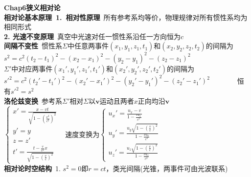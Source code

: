 \documentclass[10pt,a4paper]{article}
\begin{document}
\begin{multicols}{2}
\noindent\textbf{Chap6狭义相对论}\\
\tiny\textbf{相对论基本原理~1.~相对性原理}~所有参考系均等价，物理规律对所有惯性系均为相同形式\\
\indent\textbf{2. 光速不变原理}~真空中光速对任一惯性系沿任一方向恒为$c$\scriptsize\\
\textbf{间隔不变性}~惯性系$\Sigma$中任意两事件$(x_1,y_1,z_1,t_1)$和$(x_2,y_2,z_2,t_2)$的间隔为$s^2=c^2(t_2-t_1)^2-(x_2-x_1)^2-(y_2-y_1)^2-(z_2-z_1)^2$\\
$\Sigma'$中对应两事件$(x_1',y_1',z_1',t_1')$和$(x_2',y_2',z_2',t_2')$的间隔为$s'^2=c^2(t_2'-t_1')^2-(x_2'-x_1')^2-(y_2'-y_1')^2-(z_2'-z_1')^2$~~~~~~~~恒有$s'^2=s^2$\\
\textbf{洛伦兹变换}~参考系$\Sigma'$相对$\Sigma$以$\bm{v}$运动且两者$x$正向均沿$\bm{v}$\\
$\left\{\begin{array}{l}x'=\frac{x-vt}{\sqrt{1-(\frac{v^2}{c^2})^2}}\\y'=y\\z=z'\\t'=\frac{t-\frac{v}{c^2}x}{\sqrt{1-(\frac{v}{c})^2}}\end{array}\right.$~
速度变换为$\left\{\begin{array}{l}u_x'=\frac{u_x-v}{1-\frac{vu_x}{c^2}}\\u_y'=\frac{u_y\sqrt{1-(\frac{v}{c})^2}}{1-\frac{vu_x}{c^2}}\\u_z'=\frac{u_z\sqrt{1-(\frac{v}{c})^2}}{1-\frac{vu_x}{c^2}}\end{array}\right.$\\
\tiny\textbf{相对论时空结构}~1. $s^2=0$即$r=ct$，类光间隔(光锥，两事件可由光波联系)\\

\end{multicols}
\end{document}
